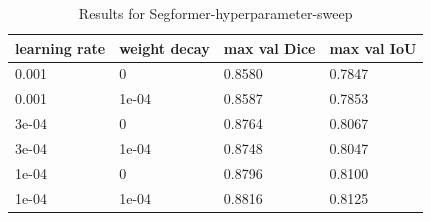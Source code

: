 \begin{table}
\caption{Results for Segformer-hyperparameter-sweep}
\label{tab-Segformer-hyperparameter-sweep_table}
\begin{tabular}{llll}
\toprule
learning rate & weight decay & max val Dice & max val IoU \\
\midrule
0.001 & 0 & 0.8580 & 0.7847 \\
0.001 & 1e-04 & 0.8587 & 0.7853 \\
3e-04 & 0 & 0.8764 & 0.8067 \\
3e-04 & 1e-04 & 0.8748 & 0.8047 \\
1e-04 & 0 & 0.8796 & 0.8100 \\
1e-04 & 1e-04 & 0.8816 & 0.8125 \\
\bottomrule
\end{tabular}
\end{table}
